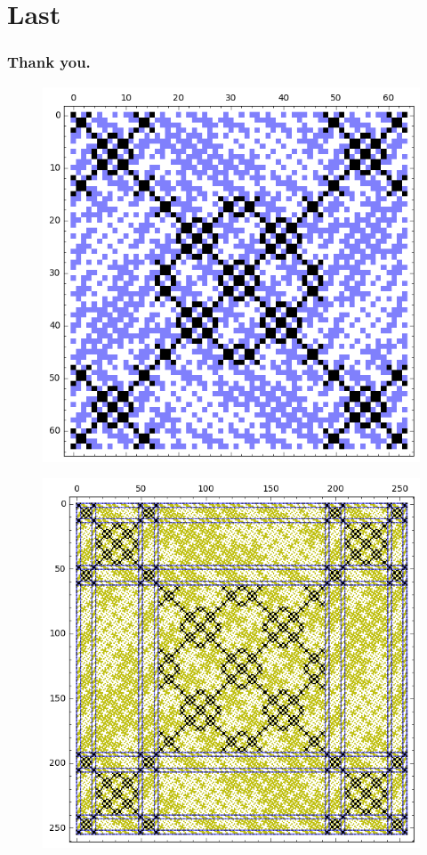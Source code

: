\documentclass[pdf,sprung,slideColor,nocolorBG]{beamer}
\newenvironment{colortheme}[1]{
\def\ProvidesPackageRCS $##1${\relax}
\renewcommand{\ProcessOptions}{\relax}
\makeatletter

\makeatother
}{}
\begin{document}
\section{Last}
\begin{colortheme}{jubata}
\begin{frame}
\frametitle{Thank you.}

\begin{figure}
\centering
\begin{minipage}{.48\textwidth}
  \centering
  \includegraphics[width=.9\linewidth]{../matrix_plot/tau_3_bent_cayley_graph_index_matrix.png}
  \label{fig:tau_3_bent_cayley_graph_index_matrix}
\end{minipage}
\begin{minipage}{.48\textwidth}
  \centering
  \includegraphics[width=.9\linewidth]{../matrix_plot/tau_4_bent_cayley_graph_index_matrix.png}

\end{minipage}
\end{figure}
\end{frame}
\end{colortheme}
\end{document}
